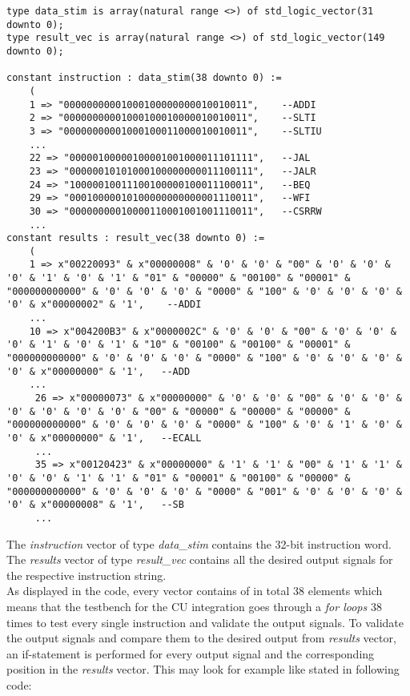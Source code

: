 \begin{lstlisting}[style=vhdl, caption=CU top testbench package]
type data_stim is array(natural range <>) of std_logic_vector(31 downto 0);
type result_vec is array(natural range <>) of std_logic_vector(149 downto 0);

constant instruction : data_stim(38 downto 0) :=
	(
	1 => "00000000001000100000000010010011",    --ADDI
	2 => "00000000001000100010000010010011",    --SLTI
	3 => "00000000001000100011000010010011",    --SLTIU
	...
	22 => "00000100000100001001000011101111",   --JAL
	23 => "00000010101000100000000011100111",   --JALR
	24 => "10000010011100100000100011100011",   --BEQ
	29 => "00010000010100000000000001110011",   --WFI
	30 => "00000000010000110001001001110011",   --CSRRW
	...
constant results : result_vec(38 downto 0) :=
	(
	1 => x"00220093" & x"00000008" & '0' & '0' & "00" & '0' & '0' & '0' & '1' & '0' & '1' & "01" & "00000" & "00100" & "00001" & "000000000000" & '0' & '0' & '0' & "0000" & "100" & '0' & '0' & '0' & '0' & x"00000002" & '1',    --ADDI
	...
	10 => x"004200B3" & x"0000002C" & '0' & '0' & "00" & '0' & '0' & '0' & '1' & '0' & '1' & "10" & "00100" & "00100" & "00001" & "000000000000" & '0' & '0' & '0' & "0000" & "100" & '0' & '0' & '0' & '0' & x"00000000" & '1',   --ADD
	...
	 26 => x"00000073" & x"00000000" & '0' & '0' & "00" & '0' & '0' & '0' & '0' & '0' & '0' & "00" & "00000" & "00000" & "00000" & "000000000000" & '0' & '0' & '0' & "0000" & "100" & '0' & '1' & '0' & '0' & x"00000000" & '1',   --ECALL
	 ...
	 35 => x"00120423" & x"00000000" & '1' & '1' & "00" & '1' & '1' & '0' & '0' & '1' & '1' & "01" & "00001" & "00100" & "00000" & "000000000000" & '0' & '0' & '0' & "0000" & "001" & '0' & '0' & '0' & '0' & x"00000008" & '1',   --SB
	 ...
\end{lstlisting}
The \textit{instruction} vector of type \textit{data\_stim} contains the 32-bit instruction word. The \textit{results} vector of type \textit{result\_vec} contains all the desired output signals for the respective instruction string. \\
 As displayed in the code, every vector contains of in total 38 elements which means that the testbench for the CU integration goes through a \textit{for loops} 38 times to test every single instruction and validate the output signals. 
 To validate the output signals and compare them to the desired output from \textit{results} vector, an if-statement is performed for every output signal and the corresponding position in the \textit{results} vector. This may look for example like stated in following code:
